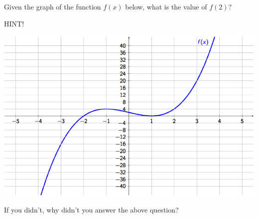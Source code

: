 \documentclass{ximera}
\begin{document}
\begin{problem} 
    Given the graph of the function $f(x)$ below, what is the value of $f(2)$?
    
    \begin{hint}
    HINT!
    \end{hint}
    
\begin{center} \includegraphics[scale=0.7]{Graphing1.png} \end{center}

  \begin{multipleChoice}
      
  \end{multipleChoice}
  
\begin{problem}
  If you didn't, why didn't you answer the above question?
  
  \begin{multipleChoice}
  \end{multipleChoice}
  
\end{problem}
  
\end{problem}
\end{document}
